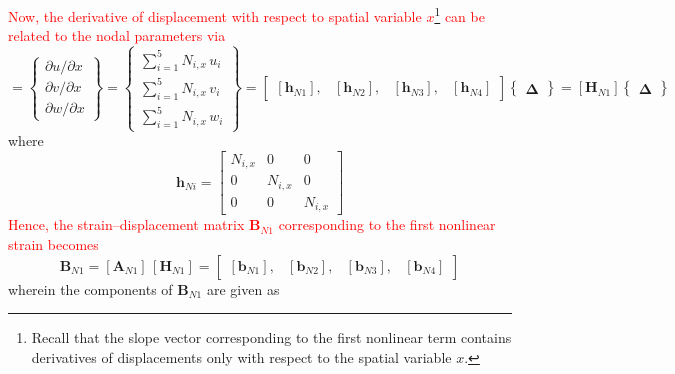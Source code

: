 \textcolor{red}{Now, the derivative of displacement with respect to spatial variable $x$\footnote{Recall that the slope vector corresponding to the first nonlinear term contains derivatives of displacements only with respect to the spatial variable $x$.} can be related to the nodal parameters via}
\begin{equation}
[\boldsymbol{\theta}_{N1}] =  \begin{Bmatrix}
\partial u / \partial x\\
\partial v / \partial x \\
\partial w / \partial x
\end{Bmatrix}
= \begin{Bmatrix}
\sum\nolimits_{i=1}^5 N_{i,x} \, u_i\\
\sum\nolimits_{i=1}^5 N_{i,x} \, v_i \\
\sum\nolimits_{i=1}^5 N_{i,x} \, w_i
\end{Bmatrix} 
= \begin{bmatrix}
[\mathbf{h}_{N1}], & [\mathbf{h}_{N2}], & [\mathbf{h}_{N3}], & [\mathbf{h}_{N4}]
\end{bmatrix}  \begin{Bmatrix} \boldsymbol{\Delta} \end{Bmatrix}  
= [\mathbf{H}_{N1}] \begin{Bmatrix} \boldsymbol{\Delta} \end{Bmatrix} 
\end{equation}
where 
\begin{equation}
\mathbf{h}_{Ni} = \begin{bmatrix}
N_{i,x} &  0 & 0  \\
0 & N_{i,x} & 0  \\
0 & 0 & N_{i,x}\end{bmatrix} 
\end{equation}
\textcolor{red}{Hence, the strain--displacement matrix $\mathbf{B}_{N1}$ corresponding to the first nonlinear strain becomes}
\begin{equation}
\mathbf{B}_{N1} = [\mathbf{A}_{N1}] \, [\mathbf{H}_{N1}] = \begin{bmatrix}
[\mathbf{b}_{N1}], & [\mathbf{b}_{N2}], & [\mathbf{b}_{N3}], & [\mathbf{b}_{N4}] 
\end{bmatrix} 
\end{equation}
wherein the components of $\mathbf{B}_{N1}$ are given as
